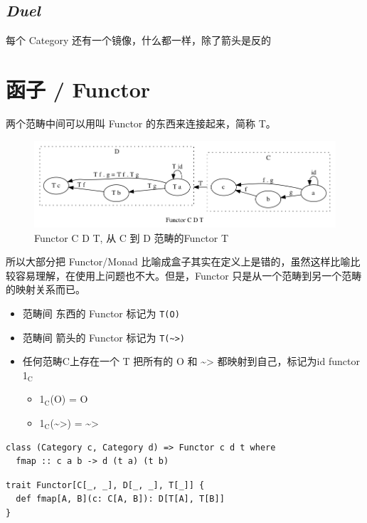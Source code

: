 \documentclass[11pt]{tufte-book}
\begin{document}
\section{\emph{Duel}}
\label{sec:org510f00a}
每个 Category 还有一个镜像，什么都一样，除了箭头是反的

\chapter{函子 / Functor}
\label{sec:orgeff4bd7}
两个范畴中间可以用叫 Functor 的东西来连接起来，简称 T。

\begin{figure}[htbp]
\centering
\includegraphics[width=.9\linewidth]{images/functor.png}
\caption{Functor C D T, 从 C 到 D 范畴的Functor T}
\end{figure}

所以大部分把 Functor/Monad 比喻成盒子其实在定义上是错的，虽然这样比喻比较容易理解，在使用上问题也不大。但是，Functor 只是从一个范畴到另一个范畴的映射关系而已。

\begin{itemize}
\item 范畴间 东西的 Functor 标记为 \texttt{T(O)}
\item 范畴间 箭头的 Functor 标记为 \texttt{T(\textasciitilde{}>)}
\item 任何范畴C上存在一个 T 把所有的 O 和 \textasciitilde{}> 都映射到自己，标记为id functor 1\(_{\text{C}}\)
\begin{itemize}
\item 1\(_{\text{C}}\)(O) = O
\item 1\(_{\text{C}}\)(\textasciitilde{}>) = \textasciitilde{}>
\end{itemize}
\end{itemize}

\begin{verbatim}
class (Category c, Category d) => Functor c d t where
  fmap :: c a b -> d (t a) (t b)
\end{verbatim}

\begin{verbatim}
trait Functor[C[_, _], D[_, _], T[_]] {
  def fmap[A, B](c: C[A, B]): D[T[A], T[B]]
}
\end{verbatim}
\end{document}
